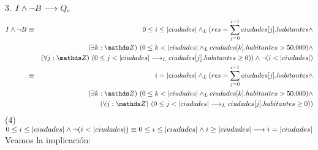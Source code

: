 \documentclass[10pt,a4paper,fleqn]{article}
\begin{document}
\item 3. $I \land \neg B \longrightarrow Q_c$\\
\begin{eqnarray}
    I \land \neg B &\equiv& 0 \leq i \leq |ciudades| \yLuego (res = \small \displaystyle \sum_{j=0}^{i-1} ciudades[j].habitantes \land \notag \\ & &\existe[unalinea]{k}{\ent}{0 \leq k< |ciudades| \yLuego ciudades[k].habitantes >  50.000 }\land \notag \\ & & \paraTodo[unalinea]{j}{\ent}{0\leq j < |ciudades| \implicaLuego ciudades[j].habitantes \geq 0}) \land \neg(i<|ciudades|) \\
    &\equiv& i=|ciudades| \yLuego (res = \small \displaystyle \sum_{j=0}^{i-1} ciudades[j].habitantes \land \notag \\ & &\existe[unalinea]{k}{\ent}{0 \leq k< |ciudades| \yLuego ciudades[k].habitantes >  50.000 }\land \notag \\ & & \paraTodo[unalinea]{j}{\ent}{0\leq j < |ciudades| \implicaLuego ciudades[j].habitantes \geq 0}) \notag 
 \end{eqnarray}
 (4) $0 \leq i \leq |ciudades| \land \neg(i<|ciudades|)\equiv 0 \leq i \leq |ciudades| \land i\geq |ciudades| \implica i = |ciudades|$\\
 Veamos la implicación:
\end{document}
